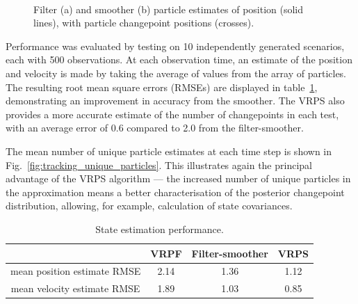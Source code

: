 \documentclass[peerreview,11pt,draftcls,onecolumn]{IEEEtran}
\begin{document}
\begin{figure}[!t]
\centering
{} \\
\caption{Filter (a) and smoother (b) particle estimates of position (solid lines), with particle changepoint positions (crosses). }
\label{fig:2D_particle_results}
\end{figure}

Performance was evaluated by testing on 10 independently generated scenarios, each with 500 observations. At each observation time, an estimate of the position and velocity is made by taking the average of values from the array of particles. The resulting root mean square errors (RMSEs) are displayed in table~\ref{tab:tracking_state_performance}, demonstrating an improvement in accuracy from the smoother. The VRPS also provides a more accurate estimate of the number of changepoints in each test, with an average error of 0.6 compared to 2.0 from the filter-smoother.

The mean number of unique particle estimates at each time step is shown in Fig.~\ref{fig:tracking_unique_particles}. This illustrates again the principal advantage of the VRPS algorithm --- the increased number of unique particles in the approximation means a better characterisation of the posterior changepoint distribution, allowing, for example, calculation of state covariances.

\begin{table}%
\caption{State estimation performance.}
\label{tab:tracking_state_performance}
\centering
\begin{tabular}{|c|c|c|c|}
\hline
 &VRPF & Filter-smoother & VRPS \\
\hline \hline
mean position estimate RMSE & 2.14 & 1.36 & 1.12 \\
\hline
mean velocity estimate RMSE & 1.89 & 1.03 & 0.85 \\
\hline
\end{tabular}
\end{table}
\end{document}
